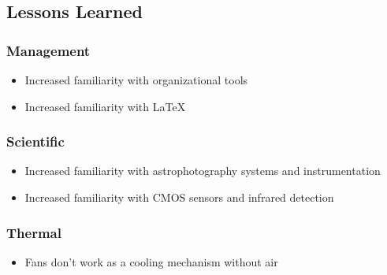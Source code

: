 \pagebreak
\subsection{Lessons Learned}

\subsubsection{Management}

\begin{itemize}
    \item Increased familiarity with organizational tools
    \item Increased familiarity with LaTeX
\end{itemize}


\subsubsection{Scientific}

\begin{itemize}
    \item Increased familiarity with astrophotography systems and instrumentation
    \item Increased familiarity with CMOS sensors and infrared detection 
\end{itemize}

\begin{comment}
\subsubsection{Electrical}
 
\begin{itemize}
    \item Friendship
    \item Sleep deprivation
\end{itemize}


\subsubsection{Software }

\begin{itemize}
    \item Friendship
    \item Sleep deprivation
\end{itemize}


\subsubsection{Mechanical }

\begin{itemize}
    \item Friendship
    \item Sleep deprivation
\end{itemize}
 \end{comment}

\subsubsection{Thermal }
\begin{itemize}
    \item Fans don't work as a cooling mechanism without air
\end{itemize}
